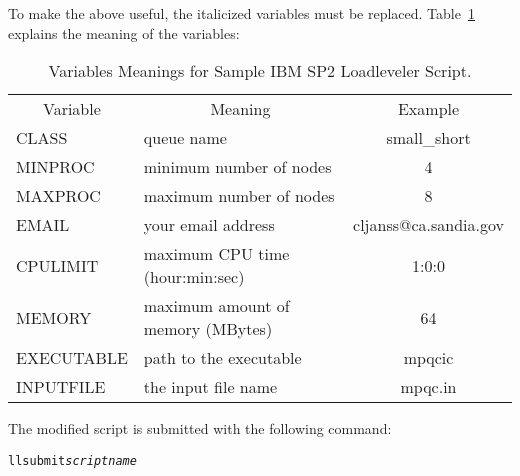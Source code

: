 To make the above useful, the italicized variables must be replaced.
Table~\ref{running:spvariables} explains the meaning of the variables:

\begin{table}
\caption{Variables Meanings for Sample IBM SP2 Loadleveler Script.}
\begin{center}
\begin{tabular}{lp{2.5in}c}
  \multicolumn{1}{c}{Variable}
     & \multicolumn{1}{c}{Meaning}
     & \multicolumn{1}{c}{Example} \\
  CLASS & queue name & small\_short \\
  MINPROC & minimum number of nodes & 4 \\
  MAXPROC & maximum number of nodes & 8 \\
  EMAIL & your email address & cljanss@ca.sandia.gov \\
  CPULIMIT & maximum CPU time (hour:min:sec) & 1:0:0 \\
  MEMORY & maximum amount of memory (MBytes) & 64 \\
  EXECUTABLE & path to the executable & mpqcic \\
  INPUTFILE & the input file name & mpqc.in \\
\end{tabular}
\end{center}
\label{running:spvariables}
\end{table}

The modified script is submitted with the following command:

\begin{alltt}
llsubmit {\itshape scriptname}
\end{alltt}

